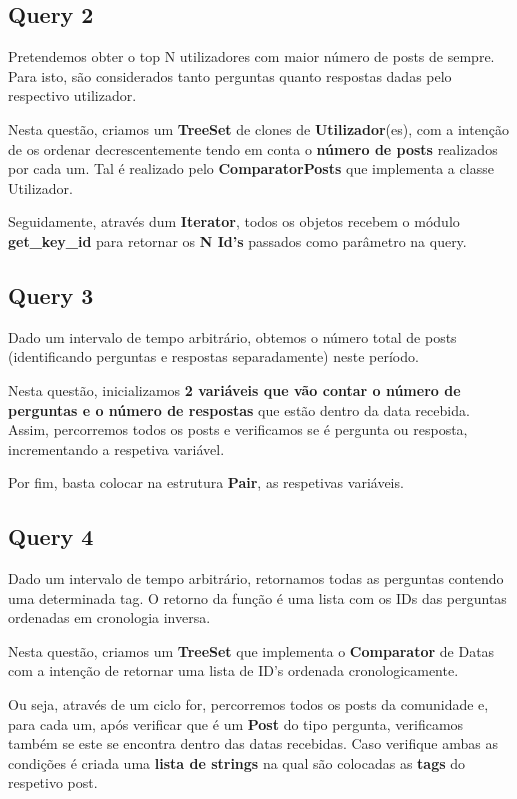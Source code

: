 \documentclass[a4paper]{article}
\begin{document}
\subsection{Query 2}

Pretendemos obter o top N utilizadores com maior número de posts de 
sempre. Para isto, são considerados tanto perguntas quanto respostas 
dadas pelo respectivo utilizador.

Nesta questão, criamos um \textbf{TreeSet} de clones de 
\textbf{Utilizador}(es), com a intenção de os ordenar decrescentemente 
tendo em conta o \textbf{número de posts} realizados por cada um. 
Tal é realizado pelo \textbf{ComparatorPosts} que implementa a classe
Utilizador.

Seguidamente, através dum \textbf{Iterator}, todos os objetos recebem
o módulo \textbf{get\_key\_id} para retornar os \textbf{N Id's} passados
como parâmetro na query.

\subsection{Query 3}

Dado um intervalo de tempo arbitrário, obtemos o número total de posts 
(identificando perguntas e respostas separadamente) neste período.

Nesta questão, inicializamos \textbf{2 variáveis que vão contar o número de 
perguntas e o número de respostas} que estão dentro da data recebida.
Assim, percorremos todos os posts e verificamos se é pergunta ou resposta,
incrementando a respetiva variável.

Por fim, basta colocar na estrutura \textbf{Pair}, as respetivas variáveis.

\subsection{Query 4}

Dado um intervalo de tempo arbitrário, retornamos todas as perguntas 
contendo uma determinada tag. O retorno da função é uma lista com os IDs 
das perguntas ordenadas em cronologia inversa.

Nesta questão, criamos um \textbf{TreeSet} que implementa o \textbf{Comparator} 
de Datas com a intenção de retornar uma lista de ID's ordenada cronologicamente.

Ou seja, através de um ciclo for, percorremos todos os posts da comunidade e, para
cada um, após verificar que é um \textbf{Post} do tipo pergunta, verificamos também
se este se encontra dentro das datas recebidas. Caso verifique ambas as condições é
criada uma \textbf{lista de strings} na qual são colocadas as \textbf{tags} do
respetivo post.
\end{document}
